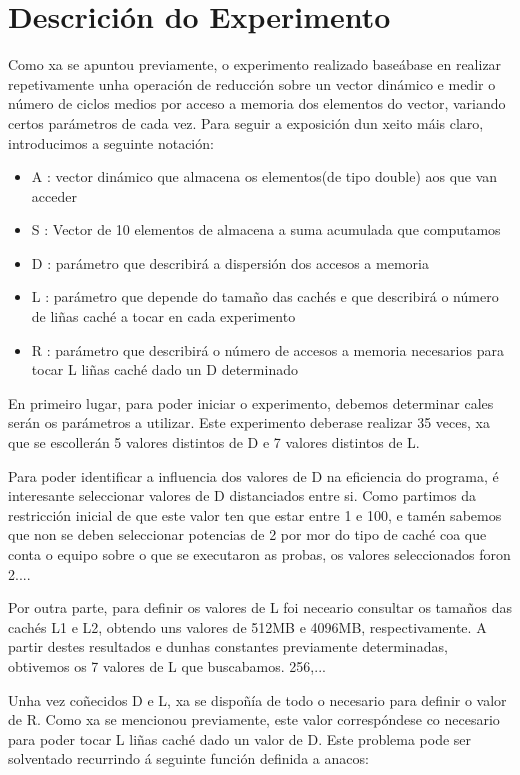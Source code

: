 \documentclass[letterpaper, 10 pt,spanish, conference]{ieeeconf}  %
\begin{document}
\section{Descrición do Experimento}

Como xa se apuntou previamente, o experimento realizado baseábase en realizar repetivamente unha operación de reducción sobre un vector dinámico e medir o número de ciclos medios por acceso a memoria dos elementos do vector, variando certos parámetros de cada vez. Para seguir a exposición dun xeito máis claro, introducimos a seguinte notación:

\begin{itemize}
    \item A : vector dinámico que almacena os elementos(de tipo double) aos que van acceder
    \item S : Vector de 10 elementos de almacena a suma acumulada que computamos
    \item D : parámetro que describirá a dispersión dos accesos a memoria
    \item L : parámetro que depende do tamaño das cachés e que describirá o número de liñas caché a tocar en cada experimento
    \item R : parámetro que describirá o número de accesos a memoria necesarios para tocar L liñas caché dado un D determinado
\end{itemize}

    En primeiro lugar, para poder iniciar o experimento,
    debemos determinar cales serán os parámetros a utilizar. Este experimento deberase realizar 35 veces, xa que se escollerán 5 valores distintos de D e 7 valores distintos de L. 
    
    Para poder identificar a influencia dos valores de D na eficiencia do programa, é interesante seleccionar valores de D distanciados entre si. Como partimos da restricción inicial de que este valor ten que estar entre 1 e 100, e tamén sabemos que non se deben seleccionar potencias de 2 por mor do tipo de caché coa que conta o equipo sobre o que se executaron as probas, os valores seleccionados foron 2....
    
    Por outra parte, para definir os valores de L foi neceario consultar os tamaños das cachés L1 e L2, obtendo uns valores de 512MB e 4096MB, respectivamente. A partir destes resultados e dunhas constantes previamente determinadas, obtivemos os 7 valores de L que buscabamos. 256,...
    
    Unha vez coñecidos D e L, xa se dispoñía de todo o necesario para definir o valor de R. Como xa se mencionou previamente, este valor correspóndese co necesario para poder tocar L liñas caché dado un valor de D. Este problema pode ser solventado recurrindo á seguinte función definida a anacos:
    
\end{document}
